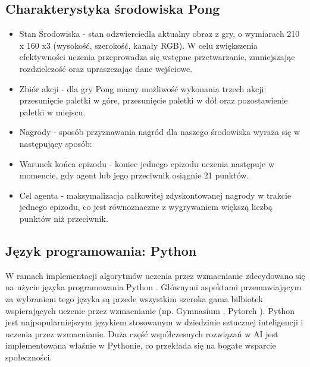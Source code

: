 \documentclass[a4paper, 12pt]{article}
\numberwithin{equation}{section}
\begin{document}
    \subsection{Charakterystyka środowiska Pong} 
    \begin{itemize}
        \item Stan Środowiska -  stan odzwierciedla aktualny obraz z gry, o wymiarach 210 x 160 x3  (wysokość, szerokość, kanały RGB). W celu zwiększenia efektywności uczenia przeprowadza się wstępne przetwarzanie, zmniejszając rozdzielczość oraz upraszczając dane wejściowe.
        \item Zbiór akcji - dla gry Pong mamy możliwość wykonania trzech akcji: przesunięcie paletki w góre, przesunięcie paletki w dół oraz pozostawienie paletki w miejscu.
        \item Nagrody - sposób przyznawania nagród dla naszego środowiska wyraża się w następujący sposób:
        \item Warunek końca epizodu - koniec jednego epizodu uczenia następuje w momencie, gdy agent lub jego przeciwnik osiągnie 21 punktów.
        \item Cel agenta - maksymalizacja całkowitej zdyskontowanej nagrody w trakcie jednego epizodu, co jest równoznaczne z wygrywaniem większą liczbą punktów niż przeciwnik.
    \end{itemize}
    \subsection{Język programowania: Python}
    W ramach implementacji algorytmów uczenia przez wzmacnianie zdecydowano się na użycie języka programowania Python \cite{python}. Głównymi aspektami przemawiającym za wybraniem tego języka są przede wszystkim szeroka gama bilbiotek wspierających uczenie przez wzmacnianie (np. Gymnasium \cite{gymnasium2025}, Pytorch \cite{pytorch2025}). Python jest najpopularniejszym językiem stosowanym w dziedzinie sztucznej inteligencji i uczenia przez wzmacnianie. Duża część współczesnych rozwiązań w AI jest implementowana właśnie w Pythonie, co przekłada się na bogate wsparcie społeczności.
\end{document}
